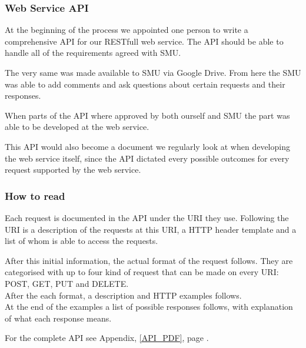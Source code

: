 \subsubsection{Web Service API}
At the beginning of the process we appointed one person to write a comprehensive API for our RESTfull web service.
The API should be able to handle all of the requirements agreed with SMU.

The very same was made available to SMU via Google Drive. From here the SMU was able to add comments and ask questions about certain requests and their responses.

When parts of the API where approved by both ourself and SMU the part was able to be developed at the web service.

This API would also become a document we regularly look at when developing the web service itself, since the API dictated every possible outcomes for every request supported by the web service.

\subsubsection{How to read}
Each request is documented in the API under the URI they use. Following the URI is a description of the requests at this URI, a HTTP header template and a list of whom is able to access the requests.

After this initial information, the actual format of the request follows. They are categorised with up to four kind of request that can be made on every URI: POST, GET, PUT and DELETE. \\
After the each format, a description and HTTP examples follows. \\
At the end of the examples a list of possible responses follows, with explanation of what each response means.

For the complete API see Appendix, \ref{API_PDF}, page \pageref{API_PDF}.